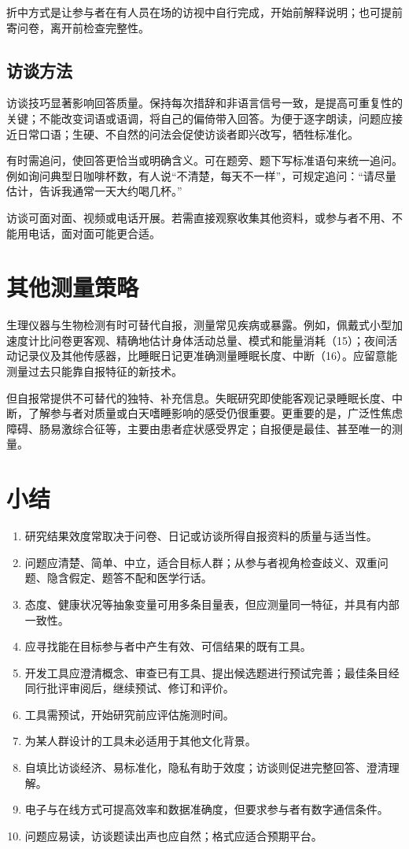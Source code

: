 折中方式是让参与者在有人员在场的访视中自行完成，开始前解释说明；也可提前寄问卷，离开前检查完整性。

\subsection{访谈方法}
访谈技巧显著影响回答质量。保持每次措辞和非语言信号一致，是提高可重复性的关键；不能改变词语或语调，将自己的偏倚带入回答。为便于逐字朗读，问题应接近日常口语；生硬、不自然的问法会促使访谈者即兴改写，牺牲标准化。

有时需追问，使回答更恰当或明确含义。可在题旁、题下写标准语句来统一追问。
例如询问典型日咖啡杯数，有人说“不清楚，每天不一样”，可规定追问：“请尽量估计，告诉我通常一天大约喝几杯。”

访谈可面对面、视频或电话开展。若需直接观察收集其他资料，或参与者不用、不能用电话，面对面可能更合适。

\section{其他测量策略}
生理仪器与生物检测有时可替代自报，测量常见疾病或暴露。例如，佩戴式小型加速度计比问卷更客观、精确地估计身体活动总量、模式和能量消耗（15）；夜间活动记录仪及其他传感器，比睡眠日记更准确测量睡眠长度、中断（16）。应留意能测量过去只能靠自报特征的新技术。

但自报常提供不可替代的独特、补充信息。失眠研究即使能客观记录睡眠长度、中断，了解参与者对质量或白天嗜睡影响的感受仍很重要。更重要的是，广泛性焦虑障碍、肠易激综合征等，主要由患者症状感受界定；自报便是最佳、甚至唯一的测量。

\section{小结}
\begin{enumerate}
\item 研究结果效度常取决于问卷、日记或访谈所得自报资料的质量与适当性。
\item 问题应清楚、简单、中立，适合目标人群；从参与者视角检查歧义、双重问题、隐含假定、题答不配和医学行话。
\item 态度、健康状况等抽象变量可用多条目量表，但应测量同一特征，并具有内部一致性。
\item 应寻找能在目标参与者中产生有效、可信结果的既有工具。
\item 开发工具应澄清概念、审查已有工具、提出候选题进行预试完善；最佳条目经同行批评审阅后，继续预试、修订和评价。
\item 工具需预试，开始研究前应评估施测时间。
\item 为某人群设计的工具未必适用于其他文化背景。
\item 自填比访谈经济、易标准化，隐私有助于效度；访谈则促进完整回答、澄清理解。
\item 电子与在线方式可提高效率和数据准确度，但要求参与者有数字通信条件。
\item 问题应易读，访谈题读出声也应自然；格式应适合预期平台。
\end{enumerate}

